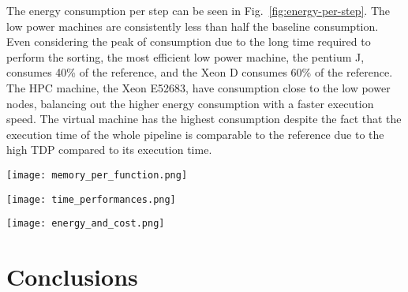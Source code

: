 \documentclass{standalone}
\begin{document}
The energy consumption per step can be seen in Fig.~\ref{fig:energy-per-step}.
The low power machines are consistently less than half the baseline consumption.
Even considering the peak of consumption due to the long time required to perform the sorting, the most efficient low power machine, the pentium J, consumes 40\% of the reference, and the Xeon D consumes 60\% of the reference.
The HPC machine, the Xeon E52683, have consumption close to the low power nodes, balancing out the higher energy consumption with a faster execution speed.
The virtual machine has the highest consumption despite the fact that the execution time of the whole pipeline is comparable to the reference due to the high TDP compared to its execution time.

\begin{figure*}[t!]
\centering
\texttt{[image: memory\_per\_function.png]}
\caption{Memory used for each step of the pipeline. Due to the GATK memory allocation strategy, all steps use a baseline amount of memory proportional to the available memory. Smaller nodes, like the low power ones, require more memory as the baseline allocated memory is not sufficient to perform the calculation.}
\label{fig:memory-per-step}
\end{figure*}

\begin{figure*}[t!]
\centering
\texttt{[image: time\_performances.png]}
\caption{Time elapsed per step of the pipeline, and total elapsed time. In the sorting step, Pentium J is 20 times slower than the reference, probably due to the limited cache size.}
\label{fig:performance-per-step}
\end{figure*}

\begin{figure*}[t!]
\centering
\texttt{[image: energy\_and\_cost.png]}
\caption{Energy consumption per pipeline step and on the whole pipeline.
Energy consumption is estimated as the time taken by the step, multiplied by the number of cores used in the step and the power consumption per core (TDP divided by the available cores).
}
\label{fig:energy-per-step}
\end{figure*}




\section*{Conclusions}
\end{document}
